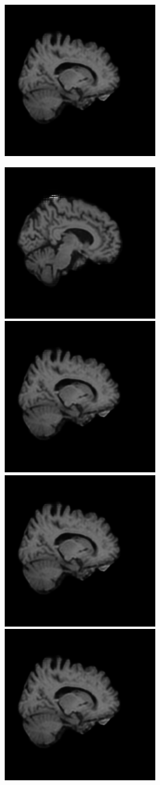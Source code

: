 \documentclass[12pt, fleqn, titlepage]{article}
\newcommand\skipper{1.4pt}
\newcommand\ripper{2.5pt}
\begin{document}
\begin{figure}[H]
\begin{subfigure}[b]{0.7\textwidth}
		\hskip\skipper
		\includegraphics[width=0.22\linewidth]{imgs/3T_no_noise}
	\end{subfigure}
	\vskip\ripper
	\begin{subfigure}[b]{0.7\textwidth}
		\centering
		\includegraphics[width=0.22\linewidth]{imgs/1.5T_no_noise}
		\hskip\skipper
		\includegraphics[width=0.22\linewidth]{imgs/3T_no_noise}
		\hskip\skipper
		\includegraphics[width=0.22\linewidth]{imgs/3T_no_noise}
		\hskip\skipper
		\includegraphics[width=0.22\linewidth]{imgs/3T_no_noise}
	\end{subfigure}
\end{figure}
\end{document}
